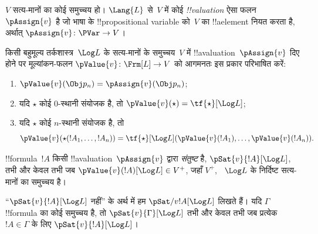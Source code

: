 \documentclass[../../../include/open-logic-section]{subfiles}
\begin{document}


\begin{defn}[!!^{valuation}s] 
$V$ सत्य-मानों का कोई समुच्चय हो। $\Lang{L}$ से~$V$ में कोई
\emph{!!{valuation}} ऐसा फलन~$\pAssign{v}$ है जो भाषा के
!!{propositional variable} को~$V$ का !!a{element} नियत करता है, अर्थात्
$\pAssign{v} \colon \PVar \to V$।
\end{defn}

\begin{defn}
  किसी बहुमूल्य तर्कशास्त्र~$\Log L$ के सत्य-मानों के समुच्चय~$V$ में
  !!a{valuation}~$\pAssign{v}$ दिए होने पर मूल्यांकन-फलन $\pValue{v}
  \colon \Frm[L] \to V$ को आगमनतः इस प्रकार परिभाषित करें:
  \begin{enumerate}
    \item $\pValue{v}(\Obj p_n) = \pAssign{v}(\Obj p_n)$; 
    \item यदि $\star$ कोई $0$-स्थानी संयोजक है, तो $\pValue{v}(\star)  = \tf{\star}[\Log L]$;
    \item यदि $\star$ कोई $n$-स्थानी संयोजक है, तो
    \[
      \pValue{v}(\star(!A_1, \dots, !A_n)) = \tf{\star}[\Log L]
      (\pValue{v}(!A_1), \dots, \pValue{v}(!A_n)).
    \]
  \end{enumerate}
\end{defn}

\begin{defn}[संतुष्टि]
 !!{formula}~$!A$ किसी
  !!a{valuation}~$\pAssign{v}$ द्वारा \emph{संतुष्ट} है,
  $\pSat{v}{!A}[\Log L]$, तभी और केवल तभी जब
  $\pValue{v}(!A)[\Log L] \in V^+$, जहाँ $V^+$, ~$\Log L$ के निर्दिष्ट
  सत्य-मानों का समुच्चय है।
  
  ``$\pSat{v}{!A}[\Log L]$ नहीं'' के अर्थ में हम
  $\pSat/{v}{!A}[\Log L]$ लिखते हैं। यदि $\Gamma$ !!{formula} का कोई
  समुच्चय है, तो $\pSat{v}{\Gamma}[\Log L]$ तभी और केवल तभी जब प्रत्येक
  ~$!A \in \Gamma$ के लिए $\pSat{v}{!A}[\Log L]$।
\end{defn}
\end{document}
